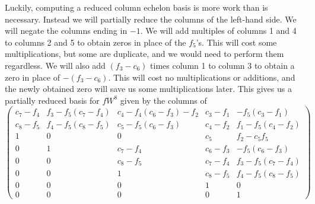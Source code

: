 Luckily, computing a reduced column echelon basis is more work than is necessary.
Instead we will partially reduce the columns of the left-hand side.
We will negate the columns ending in $-1$.
We will add multiples of columns 1 and 4 to columns 2 and 5 to obtain zeros in place of the $f_5$'s.
This will cost some multiplications, but some are duplicate, and we would need to perform them regardless.
We will also add $(f_3 - c_6)$ times column 1 to column 3 to obtain a zero in place of $-(f_3 - c_6)$.
This will cost no multiplications or additions, and the newly obtained zero will save us some multiplications later. 
This gives us a partially reduced basis for $fW^8$ given by the columns of
\[ \left( \begin{array}{lllll}
  c_7 - f_4 & f_3 - f_5(c_7 - f_4) & c_4 - f_4(c_6 - f_3) - f_2 & c_3 - f_1 &     - f_5(c_3 - f_1) \\
  c_8 - f_5 & f_4 - f_5(c_8 - f_5) & c_5 - f_5(c_6 - f_3)       & c_4 - f_2 & f_1 - f_5(c_4 - f_2)\\
          1 & 0                    & 0                          & c_5       & f_2 - c_5f_5 \\
          0 & 1                    & c_7 - f_4                  & c_6 - f_3 &     - f_5(c_6 - f_3) \\
          0 & 0                    & c_8 - f_5                  & c_7 - f_4 & f_3 - f_5(c_7 - f_4) \\
          0 & 0                    & 1                          & c_8 - f_5 & f_4 - f_5(c_8 - f_5) \\
          0 & 0                    & 0                          &         1 &   0 \\
          0 & 0                    & 0                          &         0 &   1
\end{array} \right) \]

